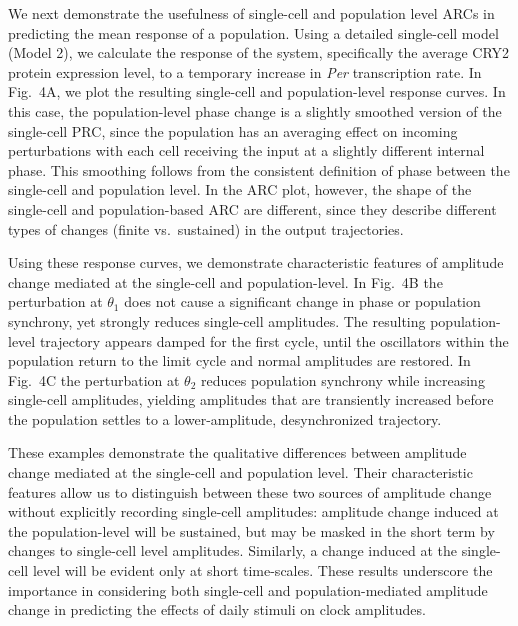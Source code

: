 \documentclass[11pt, letterpaper]{article}
\begin{document}
We next demonstrate the usefulness of single-cell and population level ARCs in
predicting the mean response of a population. Using a detailed single-cell
model (Model 2), we calculate the response of the system, specifically the
average CRY2 protein expression level, to a temporary increase in {\itshape
Per} transcription rate. In Fig.~4A, we plot the resulting single-cell and
population-level response curves. In this case, the population-level phase
change is a slightly smoothed version of the single-cell PRC, since the
population has an averaging effect on incoming perturbations with each cell
receiving the input at a slightly different internal phase. This smoothing
follows from the consistent definition of phase between the single-cell and
population level. In the ARC plot, however, the shape of the single-cell and
population-based ARC are different, since they describe different types of
changes (finite vs.\ sustained) in the output trajectories.

Using these response curves, we demonstrate characteristic features of amplitude
change mediated at the single-cell and population-level. In Fig.~4B the
perturbation at $\theta_1$ does not cause a significant change in phase or
population synchrony, yet strongly reduces single-cell amplitudes. The resulting
population-level trajectory appears damped for the first cycle, until the
oscillators within the population return to the limit cycle and normal
amplitudes are restored. In Fig.~4C the perturbation at $\theta_2$ reduces
population synchrony while increasing single-cell amplitudes, yielding
amplitudes that are transiently increased before the population settles to a
lower-amplitude, desynchronized trajectory.

These examples demonstrate the qualitative differences between amplitude change
mediated at the single-cell and population level. Their characteristic features
allow us to distinguish between these two sources of amplitude change without
explicitly recording single-cell amplitudes: amplitude change induced at the
population-level will be sustained, but may be masked in the short term by
changes to single-cell level amplitudes. Similarly, a change induced at the
single-cell level will be evident only at short time-scales. These results
underscore the importance in considering both single-cell and
population-mediated amplitude change in predicting the effects of daily stimuli
on clock amplitudes.
\end{document}

